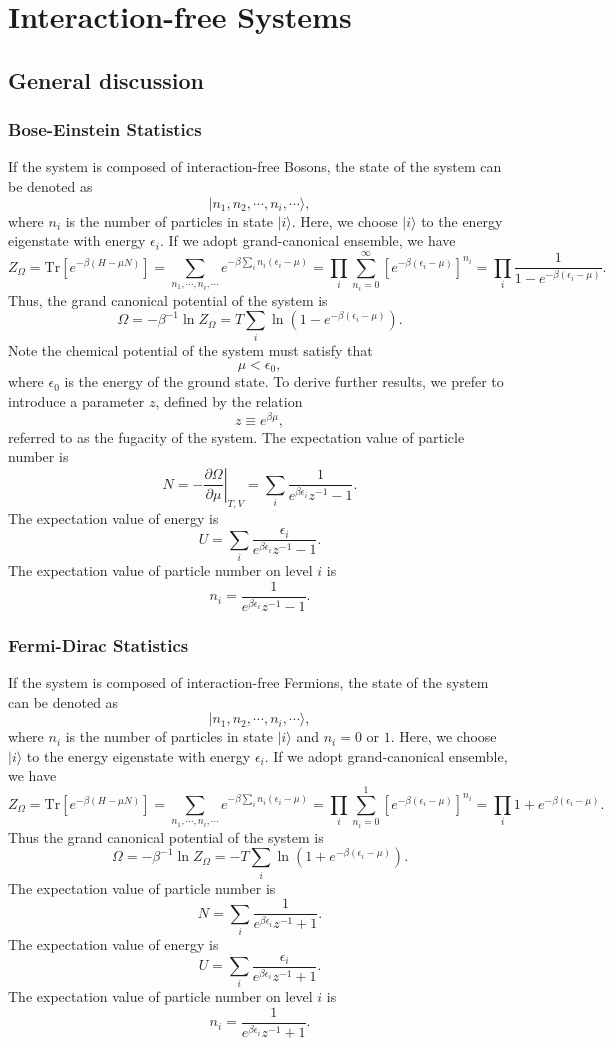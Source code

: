 \chapter{Interaction-free Systems}
\section{General discussion}
\subsection{Bose-Einstein Statistics}
If the system is composed of interaction-free Bosons, the state of the system can be denoted as
\[|n_1,n_2,\cdots,n_i,\cdots\rangle,\]
where $n_i$ is the number of particles in state $|i\rangle$. Here, we choose $|i\rangle$ to the energy eigenstate with energy $\epsilon_i$. 
If we adopt grand-canonical ensemble, we have
\[Z_{\Omega} = \mathrm{Tr}[e^{-\beta(H-\mu N)}] = \sum_{n_1,\cdots,n_i,\cdots} e^{-\beta \sum_{i}n_i(\epsilon_i-\mu)} = \prod_{i}\sum_{n_i=0}^{\infty}[e^{-\beta(\epsilon_i-\mu)}]^{n_i} = \prod_{i} \frac{1}{1-e^{-\beta(\epsilon_i - \mu)}}.\]
Thus, the grand canonical potential of the system is
\[\Omega = -\beta^{-1}\ln Z_{\Omega} = T \sum_i \ln (1 - e^{-\beta(\epsilon_i - \mu)}).\]
Note the chemical potential of the system must satisfy that
\[\mu < \epsilon_0,\] 
where $\epsilon_0$ is the energy of the ground state.
To derive further results, we prefer to introduce a parameter $z$, defined by the relation
\[z  \equiv e^{\beta \mu},\] 
referred to as the fugacity of the system.
The expectation value of particle number is
\[N = - \left. \frac{\partial \Omega}{\partial \mu} \right|_{T,V} = \sum_i \frac{1}{e^{\beta \epsilon_i}z^{-1}-1}.\]
The expectation value of energy is
\[U = \sum_i \frac{\epsilon_i}{e^{\beta \epsilon_i}z^{-1}-1}.\]
The expectation value of particle number on level $i$ is
\[n_i =  \frac{1}{e^{\beta \epsilon_i}z^{-1}-1}.\]

\subsection{Fermi-Dirac Statistics}
If the system is composed of interaction-free Fermions, the state of the system can be denoted as
\[|n_1,n_2,\cdots,n_i,\cdots\rangle,\] 
where $n_i$ is the number of particles in state $|i\rangle$ and $n_i = 0$ or $1$. Here, we choose $|i\rangle$ to the energy eigenstate with energy $\epsilon_i$.
If we adopt grand-canonical ensemble, we have
\[Z_{\Omega} = \mathrm{Tr}[e^{-\beta(H-\mu N)}] = \sum_{n_1,\cdots,n_i,\cdots} e^{-\beta \sum_{i}n_i(\epsilon_i-\mu)} = \prod_{i}\sum_{n_i=0}^{1}[e^{-\beta(\epsilon_i-\mu)}]^{n_i} = \prod_{i} 1+e^{-\beta(\epsilon_i - \mu)}.\]
Thus the grand canonical potential of the system is
\[\Omega = -\beta^{-1}\ln Z_{\Omega} = -T \sum_i \ln (1 + e^{-\beta(\epsilon_i - \mu)}).\]
The expectation value of particle number is
\[N = \sum_i \frac{1}{e^{\beta \epsilon_i}z^{-1}+1}.\]
The expectation value of energy is
\[U = \sum_i \frac{\epsilon_i}{e^{\beta \epsilon_i}z^{-1}+1}.\]
The expectation value of particle number on level $i$ is
\[n_i =  \frac{1}{e^{\beta \epsilon_i}z^{-1}+1}.\]

